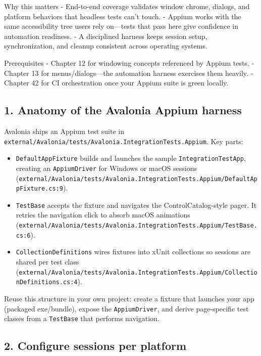 Why this matters - End-to-end coverage validates window chrome, dialogs,
and platform behaviors that headless tests can't touch. - Appium works
with the same accessibility tree users rely on---tests that pass here
give confidence in automation readiness. - A disciplined harness keeps
session setup, synchronization, and cleanup consistent across operating
systems.

Prerequisites - Chapter 12 for windowing concepts referenced by Appium
tests. - Chapter 13 for menus/dialogs---the automation harness exercises
them heavily. - Chapter 42 for CI orchestration once your Appium suite
is green locally.

\subsection{1. Anatomy of the Avalonia Appium
harness}\label{anatomy-of-the-avalonia-appium-harness}

Avalonia ships an Appium test suite in
\passthrough{\lstinline!external/Avalonia/tests/Avalonia.IntegrationTests.Appium!}.
Key parts:

\begin{itemize}
\tightlist
\item
  \passthrough{\lstinline!DefaultAppFixture!} builds and launches the
  sample \passthrough{\lstinline!IntegrationTestApp!}, creating an
  \passthrough{\lstinline!AppiumDriver!} for Windows or macOS sessions
  (\passthrough{\lstinline!external/Avalonia/tests/Avalonia.IntegrationTests.Appium/DefaultAppFixture.cs:9!}).
\item
  \passthrough{\lstinline!TestBase!} accepts the fixture and navigates
  the ControlCatalog-style pager. It retries the navigation click to
  absorb macOS animations
  (\passthrough{\lstinline!external/Avalonia/tests/Avalonia.IntegrationTests.Appium/TestBase.cs:6!}).
\item
  \passthrough{\lstinline!CollectionDefinitions!} wires fixtures into
  xUnit collections so sessions are shared per test class
  (\passthrough{\lstinline!external/Avalonia/tests/Avalonia.IntegrationTests.Appium/CollectionDefinitions.cs:4!}).
\end{itemize}

Reuse this structure in your own project: create a fixture that launches
your app (packaged exe/bundle), expose the
\passthrough{\lstinline!AppiumDriver!}, and derive page-specific test
classes from a \passthrough{\lstinline!TestBase!} that performs
navigation.

\subsection{2. Configure sessions per
platform}\label{configure-sessions-per-platform}

